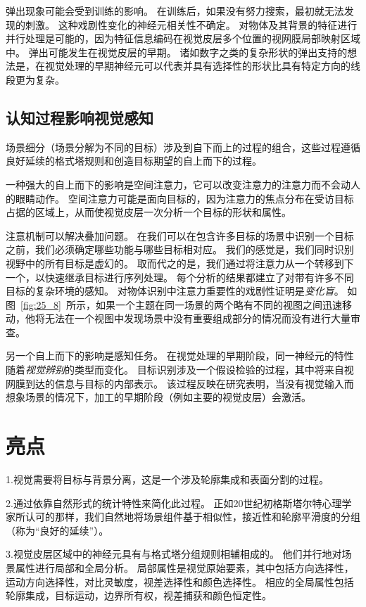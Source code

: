 弹出现象可能会受到训练的影响。
在训练后，如果没有努力搜索，最初就无法发现的刺激。 
这种戏剧性变化的神经元相关性不确定。
对物体及其背景的特征进行并行处理是可能的，因为特征信息编码在视觉皮层多个位置的视网膜局部映射区域中。
弹出可能发生在视觉皮层的早期。
诸如数字之类的复杂形状的弹出支持的想法是，在视觉处理的早期神经元可以代表并具有选择性的形状比具有特定方向的线段更为复杂。



\subsection{认知过程影响视觉感知}

场景细分（场景分解为不同的目标）涉及到自下而上的过程的组合，这些过程遵循良好延续的格式塔规则和创造目标期望的自上而下的过程。


一种强大的自上而下的影响是空间注意力，它可以改变注意力的注意力而不会动人的眼睛动作。
空间注意力可能是面向目标的，因为注意力的焦点分布在受访目标占据的区域上，从而使视觉皮层一次分析一个目标的形状和属性。


注意机制可以解决叠加问题。
在我们可以在包含许多目标的场景中识别一个目标之前，我们必须确定哪些功能与哪些目标相对应。
我们的感觉是，我们同时识别视野中的所有目标是虚幻的。
取而代之的是，我们通过将注意力从一个转移到下一个，以快速继承目标进行序列处理。
每个分析的结果都建立了对带有许多不同目标的复杂环境的感知。
对物体识别中注意力重要性的戏剧性证明是\textit{变化盲}。
如图~\ref{fig:25_8}~所示，如果一个主题在同一场景的两个略有不同的视图之间迅速移动，他将无法在一个视图中发现场景中没有重要组成部分的情况而没有进行大量审查。


另一个自上而下的影响是感知任务。
在视觉处理的早期阶段，同一神经元的特性随着\textit{视觉辨别}的类型而变化。
目标识别涉及一个假设检验的过程，其中将来自视网膜到达的信息与目标的内部表示。
该过程反映在研究表明，当没有视觉输入而想象场景的情况下，加工的早期阶段（例如主要的视觉皮层）会激活。



\section{亮点}

1.视觉需要将目标与背景分离，这是一个涉及轮廓集成和表面分割的过程。 


2.通过依靠自然形式的统计特性来简化此过程。
正如20世纪初格斯塔尔特心理学家所认可的那样，我们自然地将场景组件基于相似性，接近性和轮廓平滑度的分组（称为“良好的延续”）。


3.视觉皮层区域中的神经元具有与格式塔分组规则相辅相成的。
他们并行地对场景属性进行局部和全局分析。
局部属性是视觉原始要素，其中包括方向选择性，运动方向选择性，对比灵敏度，视差选择性和颜色选择性。
相应的全局属性包括轮廓集成，目标运动，边界所有权，视差捕获和颜色恒定性。



